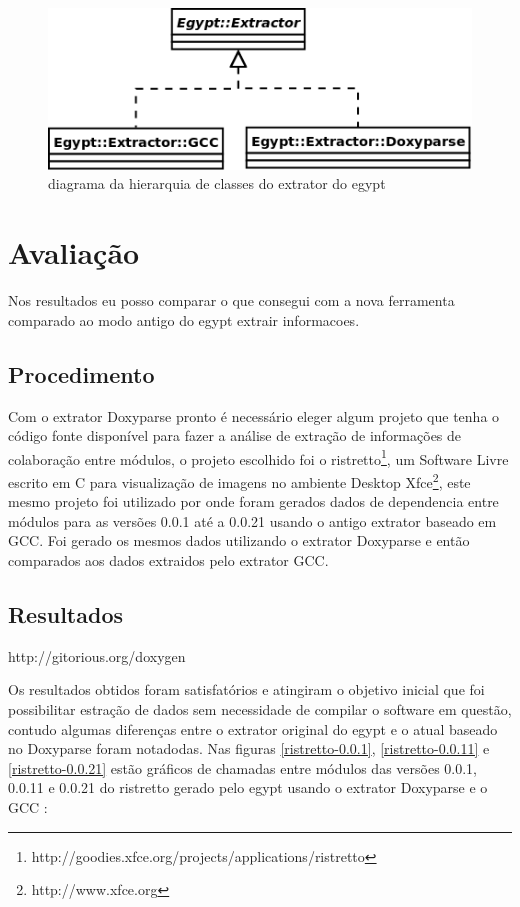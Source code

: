 \begin{figure}[h]
\center
\includegraphics[scale=0.5]{imagens/egypt-diagram-extractor}
\caption{diagrama da hierarquia de classes do extrator do egypt}
\label{egypt-diagram-extractor}
\end{figure}

\chapter{Avaliação}

Nos resultados eu posso comparar o que consegui com a nova ferramenta comparado ao modo antigo do egypt extrair informacoes.

\section{Procedimento}

Com o extrator Doxyparse pronto é necessário eleger algum projeto que tenha o
código fonte disponível para fazer a análise de extração de informações de
colaboração entre módulos, o projeto escolhido foi o
ristretto\footnote{http://goodies.xfce.org/projects/applications/ristretto}, um
Software Livre escrito em C para visualização de imagens no ambiente Desktop
Xfce\footnote{http://www.xfce.org}, este mesmo projeto foi utilizado por
\cite{StructuralComplexityEvolution} onde foram gerados dados de dependencia
entre módulos para as versões 0.0.1 até a 0.0.21 usando o antigo
extrator baseado em GCC. Foi gerado os mesmos dados utilizando o extrator
Doxyparse e então comparados aos dados extraidos pelo extrator GCC.

\section{Resultados}

http://gitorious.org/doxygen

Os resultados obtidos foram satisfatórios e atingiram o objetivo inicial que
foi possibilitar estração de dados sem necessidade de compilar o software em
questão, contudo algumas diferenças entre o extrator original do egypt e o
atual baseado no Doxyparse foram notadodas. Nas figuras \ref{ristretto-0.0.1},
\ref{ristretto-0.0.11} e \ref{ristretto-0.0.21} estão gráficos de chamadas
entre módulos das versões 0.0.1, 0.0.11 e 0.0.21 do ristretto gerado pelo egypt
usando o extrator Doxyparse e o GCC :

